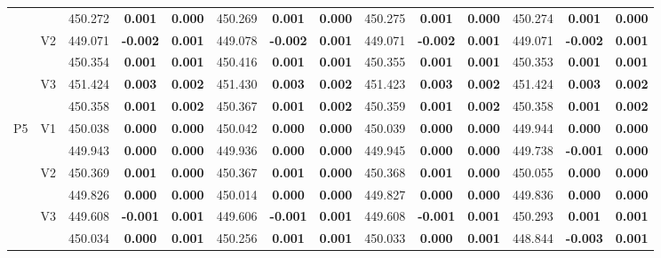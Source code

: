\documentclass[11pt,a4paper]{article}
\begin{document}
{\begin{sidewaystable}[H]
{\begin{tabular}{cc|ccc|ccc|ccc|ccc|}
   &  & 450.272 & \textbf{0.001} & \textbf{0.000} & 450.269 & \textbf{0.001} & \textbf{0.000} & 450.275 & \textbf{0.001} & \textbf{0.000} & 450.274 & \textbf{0.001} & \textbf{0.000} \\ 
   & \multirow{2}{*}{V2} & 449.071 & \textbf{-0.002} & \textbf{0.001} & 449.078 & \textbf{-0.002} & \textbf{0.001} & 449.071 & \textbf{-0.002} & \textbf{0.001} & 449.071 & \textbf{-0.002} & \textbf{0.001} \\ 
   &  & 450.354 & \textbf{0.001} & \textbf{0.001} & 450.416 & \textbf{0.001} & \textbf{0.001} & 450.355 & \textbf{0.001} & \textbf{0.001} & 450.353 & \textbf{0.001} & \textbf{0.001} \\ 
   & \multirow{2}{*}{V3} & 451.424 & \textbf{0.003} & \textbf{0.002} & 451.430 & \textbf{0.003} & \textbf{0.002} & 451.423 & \textbf{0.003} & \textbf{0.002} & 451.424 & \textbf{0.003} & \textbf{0.002} \\ 
   &  & 450.358 & \textbf{0.001} & \textbf{0.002} & 450.367 & \textbf{0.001} & \textbf{0.002} & 450.359 & \textbf{0.001} & \textbf{0.002} & 450.358 & \textbf{0.001} & \textbf{0.002} \\ 
   \hline \hline\multirow{6}{*}{P5} & \multirow{2}{*}{V1} & 450.038 & \textbf{0.000} & \textbf{0.000} & 450.042 & \textbf{0.000} & \textbf{0.000} & 450.039 & \textbf{0.000} & \textbf{0.000} & 449.944 & \textbf{0.000} & \textbf{0.000} \\ 
   &  & 449.943 & \textbf{0.000} & \textbf{0.000} & 449.936 & \textbf{0.000} & \textbf{0.000} & 449.945 & \textbf{0.000} & \textbf{0.000} & 449.738 & \textbf{-0.001} & \textbf{0.000} \\ 
   & \multirow{2}{*}{V2} & 450.369 & \textbf{0.001} & \textbf{0.000} & 450.367 & \textbf{0.001} & \textbf{0.000} & 450.368 & \textbf{0.001} & \textbf{0.000} & 450.055 & \textbf{0.000} & \textbf{0.000} \\ 
   &  & 449.826 & \textbf{0.000} & \textbf{0.000} & 450.014 & \textbf{0.000} & \textbf{0.000} & 449.827 & \textbf{0.000} & \textbf{0.000} & 449.836 & \textbf{0.000} & \textbf{0.000} \\ 
   & \multirow{2}{*}{V3} & 449.608 & \textbf{-0.001} & \textbf{0.001} & 449.606 & \textbf{-0.001} & \textbf{0.001} & 449.608 & \textbf{-0.001} & \textbf{0.001} & 450.293 & \textbf{0.001} & \textbf{0.001} \\ 
   &  & 450.034 & \textbf{0.000} & \textbf{0.001} & 450.256 & \textbf{0.001} & \textbf{0.001} & 450.033 & \textbf{0.000} & \textbf{0.001} & 448.844 & \textbf{-0.003} & \textbf{0.001} \\ 

\end{tabular}}
\end{sidewaystable}}
\end{document}
